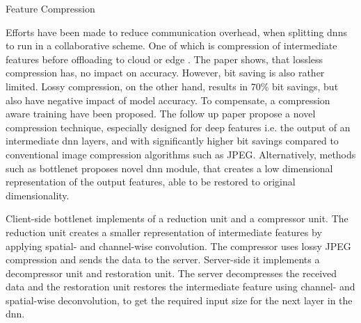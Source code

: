 \begin{enumdescript}
	\item[Feature Compression] 

	
	Efforts have been made to reduce communication overhead, when splitting \gls{dnn}s to run in a collaborative scheme. One of which is compression of intermediate features before offloading to cloud or edge \cite{choi_deep_2018}. The paper shows, that lossless compression has, no impact on accuracy. However, bit saving is also rather limited. Lossy compression, on the other hand, results in 70\% bit savings, but also have negative impact of model accuracy. To compensate, a compression aware training have been proposed. The follow up paper \cite{choi_near-lossless_2018} propose a novel compression technique, especially designed for deep features i.e. the output of an intermediate \gls{dnn} layers, and with significantly higher bit savings compared to conventional image compression algorithms such as JPEG. Alternatively, methods such as \gls{bottlenet} \cite{eshratifar_bottlenet:_2019}  proposes novel \gls{dnn} module, that creates a low dimensional representation of the output features, able to be restored to original dimensionality. 
	
	
	
	Client-side \gls{bottlenet} implements of a reduction unit and a compressor unit. The reduction unit creates a smaller representation of intermediate features by applying spatial- and channel-wise convolution. The compressor uses lossy JPEG compression and sends the data to the server. Server-side it implements a decompressor unit and restoration unit. The server decompresses the received data and the restoration unit restores the intermediate feature using channel- and spatial-wise deconvolution, to get the required input size for the next layer in the \gls{dnn}.
	

\end{enumdescript}
